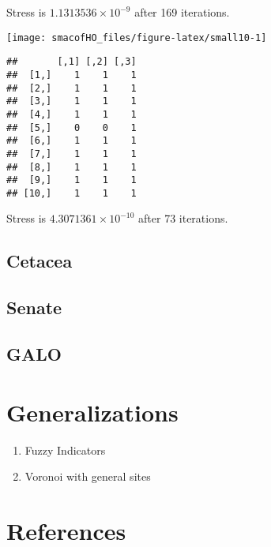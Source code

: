 \documentclass[
  12pt,
]{article}
\providecommand{\tightlist}{%
  \setlength{\itemsep}{0pt}\setlength{\parskip}{0pt}}
\begin{document}
Stress is \ensuremath{1.1313536\times 10^{-9}} after 169 iterations.

\begin{center}\texttt{[image: smacofHO\_files/figure-latex/small10-1]} \end{center}

\begin{verbatim}
##       [,1] [,2] [,3]
##  [1,]    1    1    1
##  [2,]    1    1    1
##  [3,]    1    1    1
##  [4,]    1    1    1
##  [5,]    0    0    1
##  [6,]    1    1    1
##  [7,]    1    1    1
##  [8,]    1    1    1
##  [9,]    1    1    1
## [10,]    1    1    1
\end{verbatim}

Stress is \ensuremath{4.3071361\times 10^{-10}} after 73 iterations.

\subsection{Cetacea}\label{cetacea}

\subsection{Senate}\label{senate}

\subsection{GALO}\label{galo}

\section{Generalizations}\label{generalizations}

\begin{enumerate}
\def\labelenumi{\arabic{enumi}.}
\tightlist
\item
  Fuzzy Indicators
\item
  Voronoi with general sites
\end{enumerate}

\section*{References}\label{references}
\end{document}
